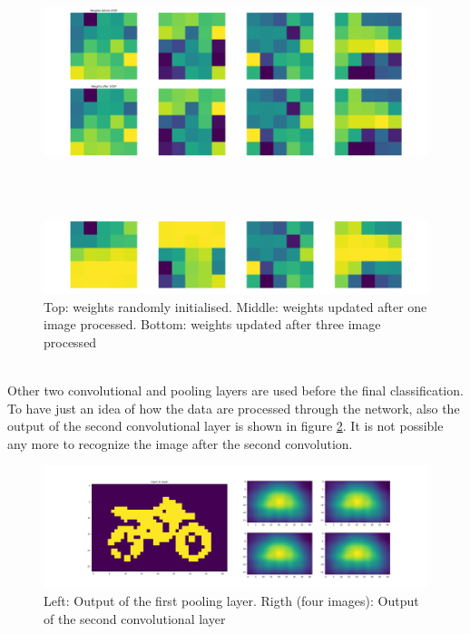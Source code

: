 \documentclass[11pt,a4paper]{scrartcl}
\begin{document}
\begin{figure}[!h]
	\centering
	\begin{minipage}[b]{\textwidth}
		\includegraphics[width=\textwidth]{images/Figure_15}
	\end{minipage}
	\\
	$\:$ \begin{minipage}[b]{\textwidth}
		\includegraphics[width=\textwidth]{images/3Figure_15}
	\end{minipage}
	\hfill
	\caption{Top: weights randomly initialised. Middle: weights updated after one image processed. Bottom: weights updated after three image processed}
	\label{fig:weights}
\end{figure}\\
\newpage
Other two convolutional and pooling layers are used before the final classification. To have just an idea of how the data are processed through the network, also the output of the second convolutional layer is shown in figure \ref{fig:conv2}. It is not possible any more to recognize the image after the second convolution.\\
\begin{figure}[!h]
	\centering
	\includegraphics[width=\textwidth]{images/Figure_10}
	\caption{Left: Output of the first pooling layer. Rigth (four images): Output of the second convolutional layer}
	\label{fig:conv2}
\end{figure}
\end{document}
